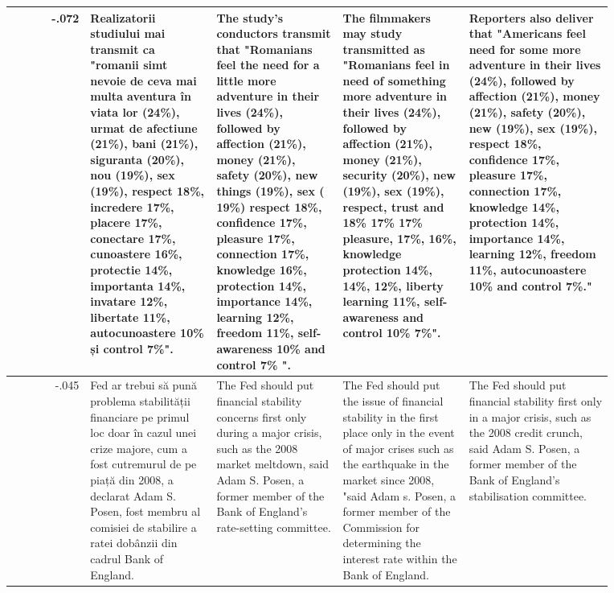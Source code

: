 \begin{table}[ht]
\begin{tabular}{r @{\hspace{1mm}} p{0.21\linewidth}p{0.21\linewidth}p{0.21\linewidth}p{0.24\linewidth}}
-.072 & Realizatorii studiului mai transmit ca "romanii simt nevoie de ceva mai multa aventura în viata lor (24\%), urmat de afectiune (21\%), bani (21\%), siguranta (20\%), nou (19\%), sex (19\%), respect 18\%, incredere 17\%, placere 17\%, conectare 17\%, cunoastere 16\%, protectie 14\%, importanta 14\%, invatare 12\%, libertate 11\%, autocunoastere 10\% și control 7\%". & The study's conductors transmit that "Romanians feel the need for a little more adventure in their lives (24\%), followed by affection (21\%), money (21\%), safety (20\%), new things (19\%), sex ( 19\%) respect 18\%, confidence 17\%, pleasure 17\%, connection 17\%, knowledge 16\%, protection 14\%, importance 14\%, learning 12\%, freedom 11\%, self-awareness 10\% and control 7\% ". & The filmmakers may study transmitted as "Romanians feel in need of something more adventure in their lives (24\%), followed by affection (21\%), money (21\%), security (20\%), new (19\%), sex (19\%), respect, trust and 18\% 17\% 17\% pleasure, 17\%, 16\%, knowledge protection 14\%, 14\%, 12\%, liberty learning 11\%, self-awareness and control 10\% 7\%". & Reporters also deliver that "Americans feel need for some more adventure in their lives (24\%), followed by affection (21\%), money (21\%), safety (20\%), new (19\%), sex (19\%), respect 18\%, confidence 17\%, pleasure 17\%, connection 17\%, knowledge 14\%, protection 14\%, importance 14\%, learning 12\%, freedom 11\%, autocunoastere 10\% and control 7\%." \\\hline
-.045 & Fed ar trebui să pună problema stabilității financiare pe primul loc doar în cazul unei crize majore, cum a fost cutremurul de pe piață din 2008, a declarat Adam S. Posen, fost membru al comisiei de stabilire a ratei dobânzii din cadrul Bank of England. & The Fed should put financial stability concerns first only during a major crisis, such as the 2008 market meltdown, said Adam S. Posen, a former member of the Bank of England's rate-setting committee. & The Fed should put the issue of financial stability in the first place only in the event of major crises such as the earthquake in the market since 2008, "said Adam s. Posen, a former member of the Commission for determining the interest rate within the Bank of England. & The Fed should put financial stability first only in a major crisis, such as the 2008 credit crunch, said Adam S. Posen, a former member of the Bank of England's stabilisation committee. \\\hline

\end{tabular}
\end{table}
